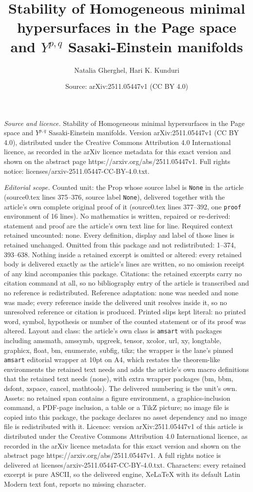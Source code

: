 \documentclass[10pt,a4paper]{amsart}
\title[Stability of Homogeneous minimal hypersurfaces in the Page s]{Stability of Homogeneous minimal hypersurfaces in the Page space and $Y^{p,q}$ Sasaki-Einstein manifolds}
\author{Natalia Gherghel, Hari K. Kunduri}
\date{Source: arXiv:2511.05447v1 (CC BY 4.0)}
\begin{document}
\maketitle

\noindent\emph{Source and licence.} Stability of Homogeneous minimal hypersurfaces in the Page space and $Y^{p,q}$ Sasaki-Einstein manifolds. Version arXiv:2511.05447v1 (CC BY 4.0), distributed under the Creative Commons Attribution 4.0 International licence, as recorded in the arXiv licence metadata for this exact version and shown on the abstract page https://arxiv.org/abs/2511.05447v1. Full rights notice: licenses/arxiv-2511.05447-CC-BY-4.0.txt.\par\smallskip

\noindent\textit{Editorial scope.} Counted unit: the Prop whose source label is \texttt{None} in the article (source0.tex lines 375--376, source label \texttt{None}), delivered together with the article's own complete original proof of it (source0.tex lines 377--392, one \texttt{proof} environment of 16 lines). No mathematics is written, repaired or re-derived: statement and proof are the article's own text line for line. Required context retained uncounted: none. Every definition, display and label of those lines is retained unchanged. Omitted from this package and not redistributed: 1--374, 393--638. Nothing inside a retained excerpt is omitted or altered: every retained body is delivered exactly as the article's lines are written, so no omission receipt of any kind accompanies this package. Citations: the retained excerpts carry no citation command at all, so no bibliography entry of the article is transcribed and no reference is redistributed. Reference adaptation: none was needed and none was made; every reference inside the delivered unit resolves inside it, so no unresolved reference or citation is produced. Printed slips kept literal: no printed word, symbol, hypothesis or number of the counted statement or of its proof was altered. Layout and class: the article's own class is \texttt{amsart} with packages including amsmath, amssymb, upgreek, tensor, xcolor, url, xy, longtable, graphicx, float, bm, enumerate, subfig, tikz; the wrapper is the lane's pinned \texttt{amsart} editorial wrapper at 10pt on A4, which restates the theorem-like environments the retained text needs and adds the article's own macro definitions that the retained text needs (none), with extra wrapper packages (bm, bbm, dsfont, xspace, cancel, mathtools). The delivered numbering is the unit's own. Assets: no retained span contains a figure environment, a graphics-inclusion command, a PDF-page inclusion, a table or a TikZ picture; no image file is copied into this package, the package declares no asset dependency and no image file is redistributed with it. Licence: version arXiv:2511.05447v1 of this article is distributed under the Creative Commons Attribution 4.0 International licence, as recorded in the arXiv licence metadata for this exact version and shown on the abstract page https://arxiv.org/abs/2511.05447v1. A full rights notice is delivered at licenses/arxiv-2511.05447-CC-BY-4.0.txt. Characters: every retained excerpt is pure ASCII, so the delivered engine, XeLaTeX with its default Latin Modern text font, reports no missing character.
\end{document}

